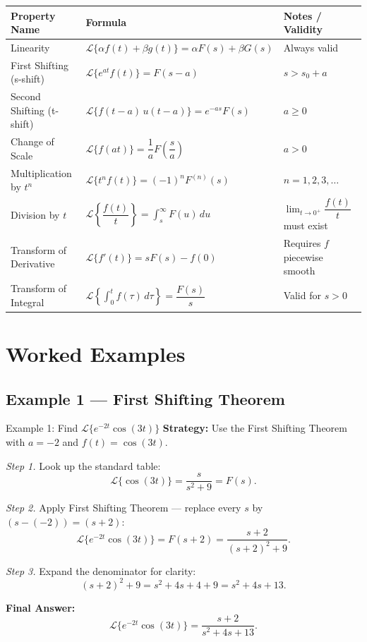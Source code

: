 \documentclass[12pt,a4paper]{article}
\begin{document}
\vspace{0.5em}
\begin{center}
\begin{tabular}{@{}p{4.5cm}p{6cm}p{4.5cm}@{}}
\toprule
\textbf{Property Name} & \textbf{Formula} & \textbf{Notes / Validity} \\
\midrule
Linearity &
  $\mathcal{L}\{\alpha f(t)+\beta g(t)\} = \alpha F(s)+\beta G(s)$ &
  Always valid \\
\midrule
First Shifting (s-shift) &
  $\mathcal{L}\{e^{at}f(t)\} = F(s-a)$ &
  $s > s_0 + a$ \\
\midrule
Second Shifting (t-shift) &
  $\mathcal{L}\{f(t-a)\,u(t-a)\} = e^{-as}F(s)$ &
  $a \geq 0$ \\
\midrule
Change of Scale &
  $\mathcal{L}\{f(at)\} = \dfrac{1}{a}F\!\left(\dfrac{s}{a}\right)$ &
  $a > 0$ \\
\midrule
Multiplication by $t^n$ &
  $\mathcal{L}\{t^n f(t)\} = (-1)^n F^{(n)}(s)$ &
  $n = 1, 2, 3, \ldots$ \\
\midrule
Division by $t$ &
  $\mathcal{L}\!\left\{\dfrac{f(t)}{t}\right\} = \displaystyle\int_s^{\infty} F(u)\,du$ &
  $\lim_{t\to 0^+}\dfrac{f(t)}{t}$ must exist \\
\midrule
Transform of Derivative &
  $\mathcal{L}\{f'(t)\} = sF(s) - f(0)$ &
  Requires $f$ piecewise smooth \\
\midrule
Transform of Integral &
  $\mathcal{L}\!\left\{\int_0^t f(\tau)\,d\tau\right\} = \dfrac{F(s)}{s}$ &
  Valid for $s > 0$ \\
\bottomrule
\end{tabular}
\end{center}
\vspace{0.5em}

\section{Worked Examples}

\subsection*{Example 1 --- First Shifting Theorem}

\begin{infobox}{Example 1: Find $\mathcal{L}\{e^{-2t}\cos(3t)\}$}
\textbf{Strategy:} Use the First Shifting Theorem with $a = -2$ and $f(t) = \cos(3t)$.

\emph{Step 1.} Look up the standard table:
\[
  \mathcal{L}\{\cos(3t)\} = \frac{s}{s^2+9} = F(s).
\]

\emph{Step 2.} Apply First Shifting Theorem --- replace every $s$ by $(s-(-2)) = (s+2)$:
\[
  \mathcal{L}\{e^{-2t}\cos(3t)\} = F(s+2) = \frac{s+2}{(s+2)^2+9}.
\]

\emph{Step 3.} Expand the denominator for clarity:
\[
  (s+2)^2 + 9 = s^2 + 4s + 4 + 9 = s^2 + 4s + 13.
\]

\textbf{Final Answer:}
\[
  \mathcal{L}\{e^{-2t}\cos(3t)\} = \frac{s+2}{s^2+4s+13}.
\]
\end{infobox}
\end{document}
